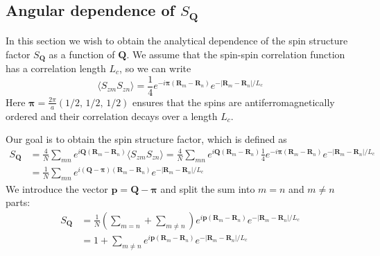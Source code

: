 \documentclass[11pt,letter]{article}
\newcommand{\bv}[1]{\ensuremath{\bm{#1}}}
\begin{document}
\newpage


\subsection{Angular dependence of $S_{\bv{Q}}$ }

In this section we wish to obtain the analytical dependence of the spin
structure factor $S_{\bv{Q}}$ as a function of $\bv{Q}$.   We assume that the
spin-spin correlation function has a correlation length $L_{c}$,  so we can
write
\begin{equation}
 \langle S_{zm}S_{zn} \rangle  =   
   \frac{1}{4} 
   e^{-i\bv{\pi}( \bv{R}_{m} - \bv{R}_{n}) } 
   e^{-|\bv{R}_{m} - \bv{R}_{n}| / L_{c} } 
\end{equation} 
Here $\bv{\pi} = \frac{2\pi}{a}(1/2,\,1/2,\,1/2)$ ensures that the spins are
antiferromagnetically ordered and their correlation decays over a length
$L_{c}$.  

Our goal is to obtain the spin structure factor, which is defined as  
\begin{equation}
\begin{split}
S_{\bv{Q}} & =  
      \frac{4}{N}
      \sum_{mn}  
      e^{ i \bv{Q}( \bv{R}_{m} - \bv{R}_{n} ) }  
      \langle S_{zm}S_{zn} \rangle 
  = 
      \frac{4}{N}
      \sum_{mn}  
      e^{ i \bv{Q}( \bv{R}_{m} - \bv{R}_{n} ) }  
   \frac{1}{4} 
   e^{-i\bv{\pi}( \bv{R}_{m} - \bv{R}_{n}) } 
   e^{-|\bv{R}_{m} - \bv{R}_{n}| / L_{c} } \\ 
   & = 
   \frac{1}{N} 
      \sum_{mn}  
      e^{ i (\bv{Q}-\bv{\pi})( \bv{R}_{m} - \bv{R}_{n} ) }  
   e^{-|\bv{R}_{m} - \bv{R}_{n}| / L_{c} }
\end{split} 
\end{equation}
We introduce the vector $\bv{p}=\bv{Q}-\bv{\pi}$ and split the sum into $m=n$
and $m\neq n$ parts:
\begin{equation}
\begin{split} 
S_{\bv{Q}}  & = 
   \frac{1}{N}\left(  
   \sum_{m=n} + 
      \sum_{m\neq n} \right) 
      e^{ i \bv{p}( \bv{R}_{m} - \bv{R}_{n} ) }  
   e^{-|\bv{R}_{m} - \bv{R}_{n}| / L_{c} }  \\
   & =  
   1 +  \sum_{m\neq n }  
      e^{ i \bv{p}( \bv{R}_{m} - \bv{R}_{n} ) }  
   e^{-|\bv{R}_{m} - \bv{R}_{n}| / L_{c} }  \\
\end{split}
\end{equation}
\end{document}
